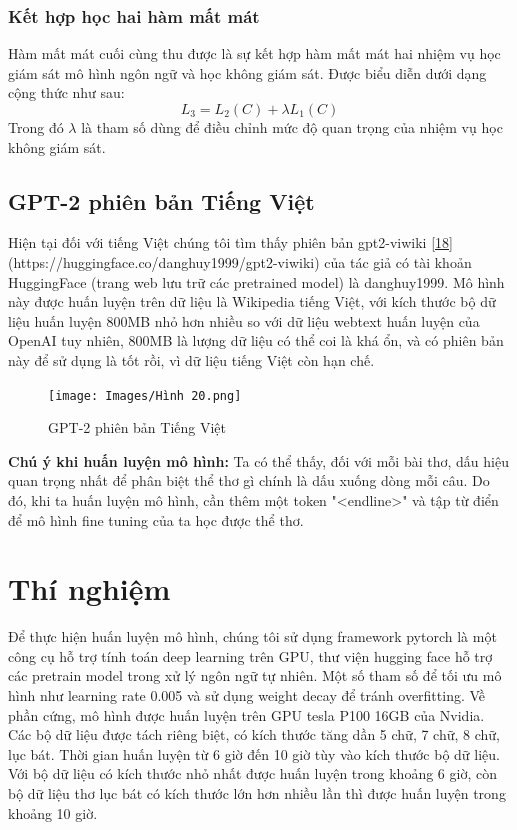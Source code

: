 \documentclass[a4paper]{article}
\theoremstyle{definition}
\begin{document}
\subsubsection{Kết hợp học hai hàm mất mát}
Hàm mất mát cuối cùng thu được là sự kết hợp hàm mất mát hai nhiệm vụ học giám sát mô hình ngôn ngữ và học không giám sát. Được biểu diễn dưới dạng cộng thức như sau: 
$$L_3 = L_2(C) + \lambda L_1(C)$$
Trong đó $\lambda$ là tham số dùng để điều chỉnh mức độ quan trọng của nhiệm vụ học không giám sát. 
\subsection{GPT-2 phiên bản Tiếng Việt}

Hiện tại đối với tiếng Việt chúng tôi tìm thấy phiên bản gpt2-viwiki \href{https://huggingface.co/danghuy1999/gpt2-viwiki}{[18]} (https://huggingface.co/danghuy1999/gpt2-viwiki)  của tác giả có tài khoản HuggingFace (trang web lưu trữ các pretrained model) là danghuy1999. 
Mô hình này được huấn luyện trên dữ liệu là Wikipedia tiếng Việt, với kích thước bộ dữ liệu huấn luyện 800MB nhỏ hơn nhiều so với dữ liệu webtext huấn luyện của OpenAI tuy nhiên, 800MB là lượng dữ liệu có thể coi là khá ổn, và có phiên bản này để sử dụng là tốt rồi, vì dữ liệu tiếng Việt còn hạn chế. 
\newpage
\begin{figure}[h!]
\begin{center}
\texttt{[image: Images/Hình 20.png]} \\[0.25in]

\caption{GPT-2 phiên bản Tiếng Việt}
\end{center}
\end{figure}

\textbf{Chú ý khi huấn luyện mô hình:} Ta có thể thấy, đối với mỗi bài thơ, dấu hiệu quan trọng nhất để phân biệt thể thơ gì chính là dấu xuống dòng mỗi câu. Do đó, khi ta huấn luyện mô hình, cần thêm một token "<endline>" và tập từ điển để mô hình fine tuning của ta học được thể thơ. 







\newpage

\section{Thí nghiệm}
Để thực hiện huấn luyện mô hình, chúng tôi sử dụng framework pytorch là một công cụ hỗ trợ tính toán deep learning trên GPU, thư viện hugging face hỗ trợ các pretrain model trong xử lý ngôn ngữ tự nhiên. Một số tham số để tối ưu mô hình như learning rate 0.005 và sử dụng weight decay để tránh overfitting. Về phần cứng, mô hình được huấn luyện trên GPU tesla P100 16GB của Nvidia. \\
Các bộ dữ liệu được tách riêng biệt, có kích thước tăng dần 5 chữ, 7 chữ, 8 chữ, lục bát. Thời gian huấn luyện từ 6 giờ đến 10 giờ tùy vào kích thước bộ dữ liệu. Với bộ dữ liệu có kích thước nhỏ nhất được huấn luyện trong khoảng 6 giờ, còn bộ dữ liệu thơ lục bát có kích thước lớn hơn nhiều lần thì được huấn luyện trong khoảng 10 giờ. 
\newpage
\end{document}
